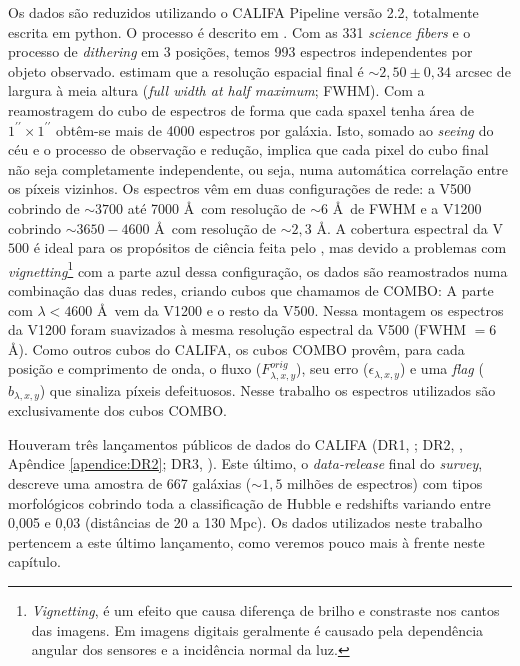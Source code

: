 Os dados são reduzidos utilizando o CALIFA Pipeline versão 2.2, totalmente escrita em {\sc python}. O processo é descrito em \citet{SFSanchez.DR3.2016}. Com as 331 {\em science fibers} e o processo de {\em dithering} em 3 posições, temos 993 espectros independentes por objeto observado. \citet{SFSanchez.DR3.2016} estimam que a resolução espacial final é $\sim2,50 \pm 0,34$ arcsec de largura à meia altura ({\em full width at half maximum}; FWHM). Com a reamostragem do cubo de espectros de forma que cada spaxel tenha área de $1^{\prime\prime} \times 1^{\prime\prime}$ obtêm-se mais de 4000 espectros por galáxia. Isto, somado ao {\em seeing} do céu e o processo de observação e redução, implica que cada pixel do cubo final não seja completamente independente, ou seja, numa automática correlação entre os píxeis vizinhos. Os espectros vêm em duas configurações de rede: a V500 cobrindo de $\sim 3700$ até 7000 \AA\ com resolução de $\sim 6$ \AA\ de FWHM e a V1200 cobrindo $\sim 3650-4600$ \AA\ com resolução de $\sim2,3$ \AA. A cobertura espectral da V$500$ é ideal para os propósitos de ciência feita pelo \starlight, mas devido a problemas com {\em vignetting}\footnote{{\em Vignetting}, é um efeito que causa diferença de brilho e constraste nos cantos das imagens. Em imagens digitais geralmente é causado pela dependência angular dos sensores e a incidência normal da luz.} com a parte azul dessa configuração, os dados são reamostrados numa combinação das duas redes, criando cubos que chamamos de COMBO: A parte com $\lambda < 4600$ \AA\ vem da V1200 e o resto da V500. Nessa montagem os espectros da V1200 foram suavizados à mesma resolução espectral da V500 (FWHM $= 6$ \AA). Como outros cubos do CALIFA, os cubos COMBO provêm, para cada posição e comprimento de onda, o fluxo ($F_{\lambda,x,y}^{orig}$), seu erro ($\epsilon_{\lambda,x,y}$) e uma {\em flag} ($b_{\lambda,x,y}$) que sinaliza píxeis defeituosos. Nesse trabalho os espectros utilizados são exclusivamente dos cubos COMBO.

Houveram três lançamentos públicos de dados do CALIFA (DR1, \citealt{Husemann.etal.2013a}; DR2, \citealt{GarciaBenito.etal.2015a}, Apêndice \ref{apendice:DR2}; DR3, \citealt{SFSanchez.DR3.2016}). Este último, o {\em data-release} final do {\em survey}, descreve uma amostra de 667 galáxias ($\sim 1,5$ milhões de espectros) com tipos morfológicos cobrindo toda a classificação de Hubble e redshifts variando entre 0,005 e 0,03 (distâncias de 20 a 130 Mpc). Os dados utilizados neste trabalho pertencem a este último lançamento, como veremos pouco mais à frente neste capítulo.


